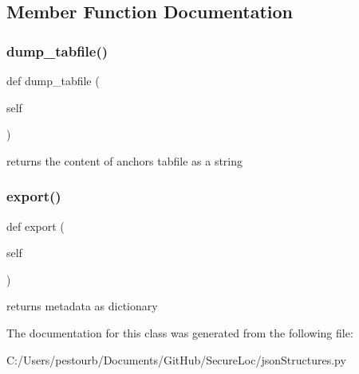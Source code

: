 \subsection{Member Function Documentation}
\mbox{\label{classjson_structures_1_1metadata_ad58622cada13d50f915c4e27ca4c711e}} 
\subsubsection{\texorpdfstring{dump\+\_\+tabfile()}{dump\_tabfile()}}
{\footnotesize\ttfamily def dump\+\_\+tabfile (\begin{DoxyParamCaption}\item[{}]{self }\end{DoxyParamCaption})}

\begin{DoxyVerb}returns the content of anchors tabfile as a string\end{DoxyVerb}
 \mbox{\label{classjson_structures_1_1metadata_a68cc2498d25cf6670863c141957ac262}} 
\subsubsection{\texorpdfstring{export()}{export()}}
{\footnotesize\ttfamily def export (\begin{DoxyParamCaption}\item[{}]{self }\end{DoxyParamCaption})}

\begin{DoxyVerb}returns metadata as dictionary\end{DoxyVerb}
 

The documentation for this class was generated from the following file\+:\begin{DoxyCompactItemize}
\item 
C\+:/\+Users/pestourb/\+Documents/\+Git\+Hub/\+Secure\+Loc/json\+Structures.\+py\end{DoxyCompactItemize}
